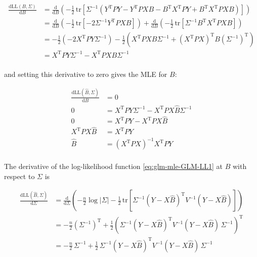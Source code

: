 \documentclass[a4paper,12pt,twoside]{book}
\begin{document}
\begin{equation} \label{eq:glm-mle-dLL-dB}
\begin{split}
\frac{\mathrm{d}\mathrm{LL}(B,\Sigma)}{\mathrm{d}B} &= \frac{\mathrm{d}}{\mathrm{d}B} \left( - \frac{1}{2} \, \mathrm{tr}\left[ \Sigma^{-1} \left( Y^\mathrm{T} P Y - Y^\mathrm{T} P X B - B^\mathrm{T} X^\mathrm{T} P Y + B^\mathrm{T} X^\mathrm{T} P X B \right) \right] \right) \\
&= \frac{\mathrm{d}}{\mathrm{d}B} \left( -\frac{1}{2} \, \mathrm{tr}\left[ -2 \Sigma^{-1} Y^\mathrm{T} P X B \right] \right) + \frac{\mathrm{d}}{\mathrm{d}B} \left( -\frac{1}{2} \, \mathrm{tr}\left[ \Sigma^{-1} B^\mathrm{T} X^\mathrm{T} P X B \right] \right) \\
&= - \frac{1}{2} \left( -2 X^\mathrm{T} P Y \Sigma^{-1} \right) - \frac{1}{2} \left( X^\mathrm{T} P X B \Sigma^{-1} + (X^\mathrm{T} P X)^\mathrm{T} B (\Sigma^{-1})^\mathrm{T} \right) \\
&= X^\mathrm{T} P Y \Sigma^{-1} - X^\mathrm{T} P X B \Sigma^{-1} \\
\end{split}
\end{equation}

and setting this derivative to zero gives the MLE for $B$:

\begin{equation} \label{eq:glm-mle-B-MLE}
\begin{split}
\frac{\mathrm{d}\mathrm{LL}(\hat{B},\Sigma)}{\mathrm{d}B} &= 0 \\
0 &= X^\mathrm{T} P Y \Sigma^{-1} - X^\mathrm{T} P X \hat{B} \Sigma^{-1} \\
0 &= X^\mathrm{T} P Y - X^\mathrm{T} P X \hat{B} \\
X^\mathrm{T} P X \hat{B} &= X^\mathrm{T} P Y \\
\hat{B} &= \left( X^\mathrm{T} P X \right)^{-1} X^\mathrm{T} P Y \\
\end{split}
\end{equation}

\vspace{1em}
The derivative of the log-likelihood function \eqref{eq:glm-mle-GLM-LL1} at $\hat{B}$ with respect to $\Sigma$ is

\begin{equation} \label{eq:glm-mle-dLL-dS}
\begin{split}
\frac{\mathrm{d}\mathrm{LL}(\hat{B},\Sigma)}{\mathrm{d}\Sigma} &= \frac{\mathrm{d}}{\mathrm{d}\Sigma} \left( - \frac{n}{2} \log |\Sigma| - \frac{1}{2} \, \mathrm{tr}\left[ \Sigma^{-1} (Y - X\hat{B})^\mathrm{T} V^{-1} (Y - X\hat{B}) \right] \right) \\
&= - \frac{n}{2} \left( \Sigma^{-1} \right)^\mathrm{T} + \frac{1}{2} \left( \Sigma^{-1} (Y - X\hat{B})^\mathrm{T} V^{-1} (Y - X\hat{B}) \, \Sigma^{-1} \right)^\mathrm{T} \\
&= - \frac{n}{2} \, \Sigma^{-1} + \frac{1}{2} \, \Sigma^{-1} (Y - X\hat{B})^\mathrm{T} V^{-1} (Y - X\hat{B}) \, \Sigma^{-1} \\
\end{split}
\end{equation}
\end{document}

